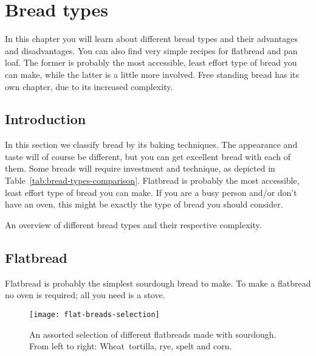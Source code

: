 \chapter{Bread types}%
\label{ch:bread-types}
\begin{quoting}
In this chapter you will learn about different bread types and their
advantages and disadvantages.  You can also find very simple recipes for
flatbread and pan loaf.  The former is probably the most accessible, least
effort type of bread you can make, while the latter is a little more involved.
Free standing bread has its own chapter, due to its increased complexity.
\end{quoting}

\section{Introduction}%
\label{sec:intro}

In this section we classify bread by its baking techniques. The appearance and
taste will of course be different, but you can get excellent bread with each
of them. Some breads will require investment and technique, as depicted in
Table~\ref{tab:bread-types-comparison}.  Flatbread is probably the most
accessible, least effort type of bread you can make. If you are a busy person
and/or don’t have an oven, this might be exactly the type of bread you should
consider. 
\begin{table}[!htb]
    \begin{center}
        
        \caption[Different bread types]{An overview of different bread types
            and their respective complexity.}%
        \label{tab:bread-types-comparison}
    \end{center}
\end{table}

\section{Flatbread}%
\label{sec:flatbread}

Flatbread is probably the simplest sourdough bread to make.
To make a flatbread no oven is required; all you need is a stove.

\begin{figure}[!htb]
  \texttt{[image: flat-breads-selection]}
  \caption[Flatbread selection with different flours]{An assorted selection of
      different flatbreads made with sourdough. From left to right:
      Wheat~tortilla, rye, spelt and corn.}%
\end{figure}

